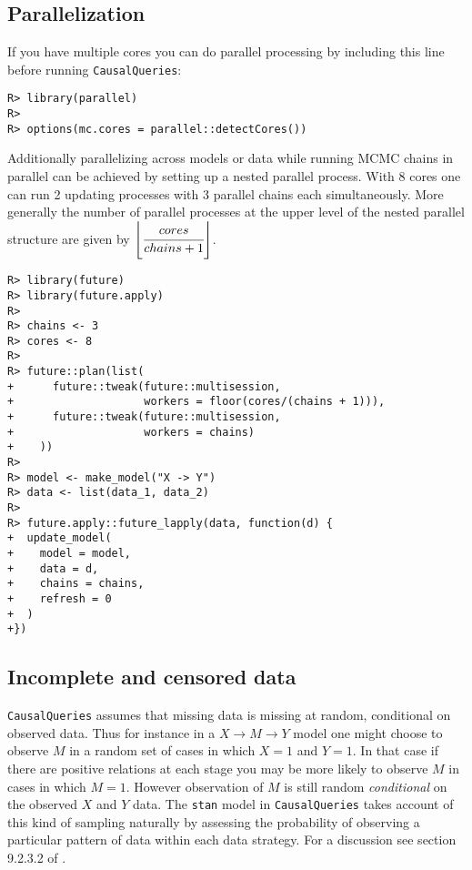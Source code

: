 \documentclass[
  11pt,
  article]{jss}
\begin{document}
\hypertarget{parallelization}{%
\subsection{Parallelization}\label{parallelization}}

If you have multiple cores you can do parallel processing by including
this line before running \texttt{CausalQueries}:

\begin{verbatim}
R> library(parallel)
R> 
R> options(mc.cores = parallel::detectCores())
\end{verbatim}

Additionally parallelizing across models or data while running MCMC
chains in parallel can be achieved by setting up a nested parallel
process. With 8 cores one can run 2 updating processes with 3 parallel
chains each simultaneously. More generally the number of parallel
processes at the upper level of the nested parallel structure are given
by \(\left \lfloor \cfrac{cores}{chains + 1} \right \rfloor\).

\begin{verbatim}
R> library(future)
R> library(future.apply)
R> 
R> chains <- 3
R> cores <- 8
R> 
R> future::plan(list(
+      future::tweak(future::multisession, 
+                    workers = floor(cores/(chains + 1))),
+      future::tweak(future::multisession, 
+                    workers = chains)
+    ))
R> 
R> model <- make_model("X -> Y")
R> data <- list(data_1, data_2)
R> 
R> future.apply::future_lapply(data, function(d) {
+  update_model(
+    model = model,
+    data = d,
+    chains = chains,
+    refresh = 0
+  )
+})
\end{verbatim}

\hypertarget{incomplete-and-censored-data}{%
\subsection{Incomplete and censored
data}\label{incomplete-and-censored-data}}

\texttt{CausalQueries} assumes that missing data is missing at random,
conditional on observed data. Thus for instance in a
\(X \rightarrow M \rightarrow Y\) model one might choose to observe
\(M\) in a random set of cases in which \(X=1\) and \(Y=1\). In that
case if there are positive relations at each stage you may be more
likely to observe \(M\) in cases in which \(M=1\). However observation
of \(M\) is still random \emph{conditional} on the observed \(X\) and
\(Y\) data. The \texttt{stan} model in \texttt{CausalQueries} takes
account of this kind of sampling naturally by assessing the probability
of observing a particular pattern of data within each data strategy. For
a discussion see section 9.2.3.2 of \citet{ii2023}.
\end{document}
